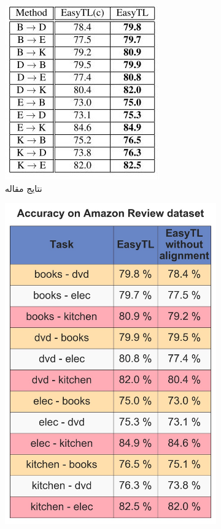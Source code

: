 \begin{figure}[H]
	\centering
	\begin{subfigure}[b]{0.2\textwidth}
		\centering
		\includegraphics[width=0.85\linewidth]{images/1_4.jpg}
		\caption{نتایج مقاله}
	\end{subfigure}%
	\begin{subfigure}[b]{0.2\textwidth}
		\centering
		\includegraphics[width=0.85\linewidth]{images/1_1.jpg}

\end{subfigure}
\end{figure}
